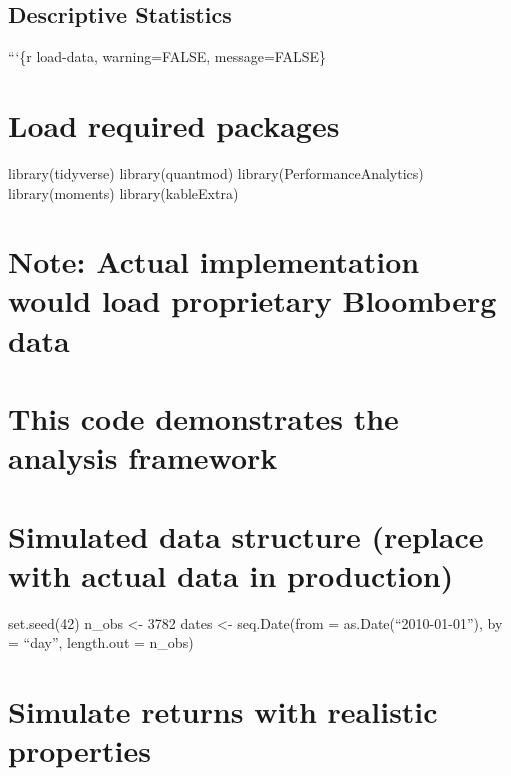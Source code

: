 \documentclass[
  10pt,
  a4paper,
]{article}
\begin{document}
\subsection{Descriptive Statistics}\label{descriptive-statistics}

\begin{tcolorbox}[enhanced jigsaw, title=\textcolor{quarto-callout-note-color}{\faInfo}\hspace{0.5em}{Interactive Data Exploration}, toprule=.15mm, left=2mm, colframe=quarto-callout-note-color-frame, opacitybacktitle=0.6, bottomtitle=1mm, leftrule=.75mm, coltitle=black, opacityback=0, breakable, toptitle=1mm, colbacktitle=quarto-callout-note-color!10!white, titlerule=0mm, arc=.35mm, colback=white, rightrule=.15mm, bottomrule=.15mm]

```\{r load-data, warning=FALSE, message=FALSE\}

\section{Load required packages}\label{load-required-packages}

library(tidyverse) library(quantmod) library(PerformanceAnalytics)
library(moments) library(kableExtra)

\section{Note: Actual implementation would load proprietary Bloomberg
data}\label{note-actual-implementation-would-load-proprietary-bloomberg-data}

\section{This code demonstrates the analysis
framework}\label{this-code-demonstrates-the-analysis-framework}

\section{Simulated data structure (replace with actual data in
production)}\label{simulated-data-structure-replace-with-actual-data-in-production}

set.seed(42) n\_obs \textless- 3782 dates \textless- seq.Date(from =
as.Date(``2010-01-01''), by = ``day'', length.out = n\_obs)

\section{Simulate returns with realistic
properties}\label{simulate-returns-with-realistic-properties}


\end{tcolorbox}
\end{document}
